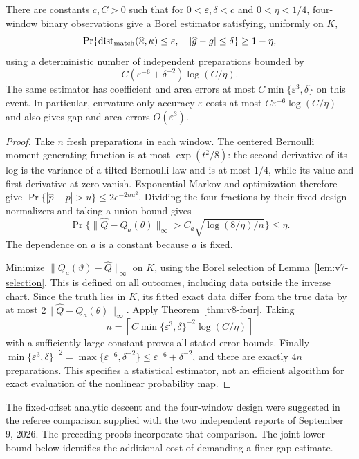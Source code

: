 \begin{corollary}
\label{cor:v8-fixed-sampling}
There are constants $c,C>0$ such that for $0<\varepsilon,\delta<c$
and $0<\eta<1/4$, four-window binary observations give a Borel estimator
satisfying, uniformly on $K$,
\begin{equation}\label{eq:v8-joint-confidence}
 \Pr\{\operatorname{dist}_{\rm match}(\widehat\kappa,\kappa)
       \le\varepsilon,\quad |\widehat g-g|\le\delta\}\ge1-\eta,
\end{equation}
using a deterministic number of independent preparations bounded by
\begin{equation}\label{eq:v8-fixed-cost}
                  C(\varepsilon^{-6}+\delta^{-2})\log(C/\eta).
\end{equation}
The same estimator has coefficient and area errors at most
$C\min\{\varepsilon^3,\delta\}$ on this event. In particular,
curvature-only accuracy $\varepsilon$ costs at most
$C\varepsilon^{-6}\log(C/\eta)$ and also gives gap and area errors
$O(\varepsilon^3)$.
\end{corollary}
\begin{proof}
Take $n$ fresh preparations in each window. The centered Bernoulli
moment-generating function is at most $\exp(t^2/8)$: the second
derivative of its log is the variance of a tilted Bernoulli law and
is at most $1/4$, while its value and first derivative at zero vanish.
Exponential Markov and optimization therefore give
$\Pr\{|\widehat p-p|>u\}\le2e^{-2nu^2}$. Dividing the four fractions
by their fixed design normalizers and taking a union bound gives
\[
 \Pr\{\|\widehat Q-Q_a(\theta)\|_\infty>
                       C_a\sqrt{\log(8/\eta)/n}\}\le\eta.
\]
The dependence on $a$ is a constant because $a$ is fixed.

Minimize $\|Q_a(\vartheta)-\widehat Q\|_\infty$ on $K$, using the
Borel selection of Lemma~\ref{lem:v7-selection}. This is defined on
all outcomes, including data outside the inverse chart. Since the
truth lies in $K$, its fitted exact data differ from the true data by
at most $2\|\widehat Q-Q_a(\theta)\|_\infty$. Apply
Theorem~\ref{thm:v8-four}. Taking
\[
 n=\left\lceil C\min\{\varepsilon^3,\delta\}^{-2}
                                     \log(C/\eta)\right\rceil
\]
with a sufficiently large constant proves all stated error bounds.
Finally $\min\{\varepsilon^3,\delta\}^{-2}
=\max\{\varepsilon^{-6},\delta^{-2}\}
\le\varepsilon^{-6}+\delta^{-2}$, and there are exactly $4n$
preparations. This specifies a statistical estimator, not an efficient
algorithm for exact evaluation of the nonlinear probability map.
\end{proof}

The fixed-offset analytic descent and the four-window design were
suggested in the referee comparison supplied with the two independent
reports of September 9, 2026. The preceding proofs incorporate that
comparison. The joint lower bound below identifies the additional
cost of demanding a finer gap estimate.
